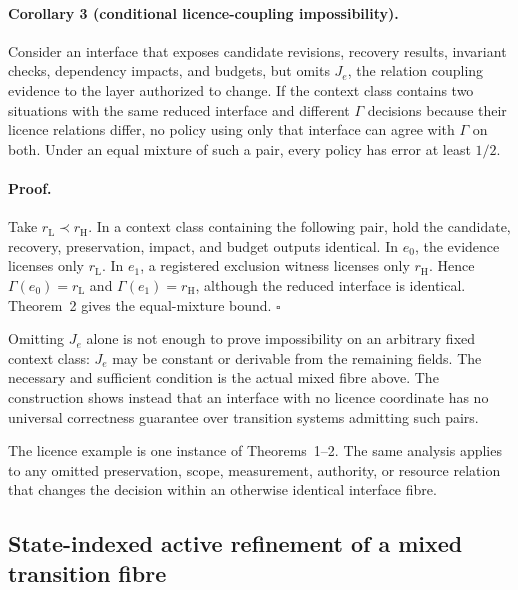 \paragraph{Corollary 3 (conditional licence-coupling impossibility).}
Consider an interface that exposes candidate revisions, recovery results,
invariant checks, dependency impacts, and budgets, but omits $J_e$, the relation
coupling evidence to the layer authorized to change. If the context class
contains two situations with the same reduced interface and different
$\Gamma$ decisions because their licence relations differ, no policy using
only that interface can agree with $\Gamma$ on both. Under an equal mixture of
such a pair, every policy has error at least $1/2$.

\paragraph{Proof.}
Take $r_{\mathrm L}\prec r_{\mathrm H}$. In a context class containing the
following pair, hold the candidate, recovery, preservation, impact, and budget
outputs identical. In $e_0$, the
evidence licenses only $r_{\mathrm L}$. In $e_1$, a registered exclusion
witness licenses only $r_{\mathrm H}$. Hence
$\Gamma(e_0)=r_{\mathrm L}$ and $\Gamma(e_1)=r_{\mathrm H}$, although the
reduced interface is identical. Theorem~2 gives the equal-mixture bound.
\hfill$\square$

Omitting $J_e$ alone is not enough to prove impossibility on an arbitrary fixed
context class: $J_e$ may be constant or derivable from the remaining fields.
The necessary and sufficient condition is the actual mixed fibre above. The
construction shows instead that an interface with no licence coordinate has no
universal correctness guarantee over transition systems admitting such pairs.

The licence example is one instance of Theorems~1--2. The same analysis
applies to any omitted preservation, scope, measurement, authority, or resource
relation that changes the decision within an otherwise identical interface
fibre.


\subsection{State-indexed active refinement of a mixed transition fibre}

